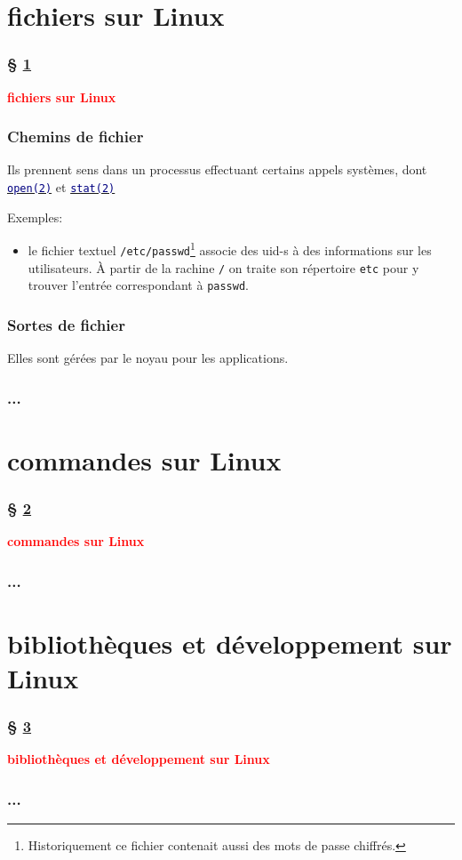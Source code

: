 \documentclass[lualatex,11pt,a4paper,svgnames,french]{beamer}
\newcommand{\clbrougras}[1]{{\textcolor{Red}{\textbf{#1}}}}
\begin{document}
\section{fichiers sur Linux}
\label{sec:file}
\begin{frame}\frametitle{§ \ref{sec:file}}
{\Large \clbrougras{fichiers sur Linux}}
\end{frame}
\begin{frame}\frametitle{Chemins de fichier}
  Ils prennent sens dans un processus effectuant certains appels systèmes, dont 
  {\href{https://man7.org/linux/man-pages/man2/open.2.html}{\texttt{\textcolor{Navy}{open(2)}}}} et 
  {\href{https://man7.org/linux/man-pages/man2/stat.2.html}{\texttt{\textcolor{Navy}{stat(2)}}}}

  \medskip

  Exemples:
  \begin{itemize}
  \item le fichier textuel
    \texttt{/etc/passwd}\footnote{Historiquement ce fichier contenait
    aussi des mots de passe chiffrés.} associe des uid-s à des
    informations sur les utilisateurs. À partir de la rachine
    \texttt{/} on traite son répertoire \texttt{etc} pour y trouver
    l'entrée correspondant à \texttt{passwd}.
  \end{itemize}
\end{frame}
\begin{frame}\frametitle{Sortes de fichier}
  Elles sont gérées par le noyau pour les applications.
\end{frame}
\begin{frame}\frametitle{...}
  {}
\end{frame}
\section{commandes sur Linux}
\label{sec:commands}
\begin{frame}\frametitle{§ \ref{sec:commands}}
{\Large \clbrougras{commandes sur Linux}}
\end{frame}
\begin{frame}\frametitle{...}
  {}
\end{frame}

\section{bibliothèques et développement sur Linux}
\label{sec:libr-devel}
\begin{frame}\frametitle{§ \ref{sec:libr-devel}}
{\Large \clbrougras{bibliothèques et développement sur Linux}}
\end{frame}

\begin{frame}\frametitle{...}
  {}
\end{frame}
\end{document}
